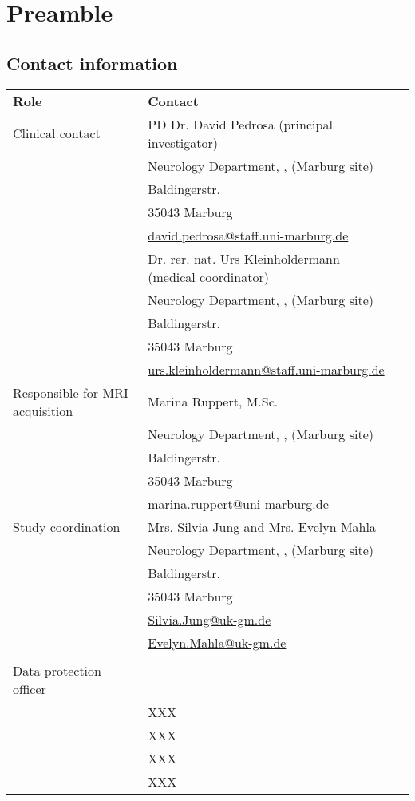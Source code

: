 \chapter{Preamble}
\section{Contact information}
\begin{tabularx}{0.85\textwidth}{@{}lp{9cm} *{1}{l} @{}}
\toprule
\textbf{Role} & \textbf{Contact} \\
\cmidrule{1-2}
Clinical contact 	& PD Dr. David Pedrosa (principal investigator) \\
			& Neurology Department, \UKM, (Marburg site)\\
			& Baldingerstr.\\
			& 35043 Marburg\\
			& \href{mailto:david.pedrosa@staff.uni-marburg.de}{david.pedrosa@staff.uni-marburg.de}\\
\cmidrule{2-3}
			& Dr. rer. nat. Urs Kleinholdermann (medical coordinator) \\
			& Neurology Department, \UKM, (Marburg site)\\
			& Baldingerstr.\\
			& 35043 Marburg\\
			& \href{mailto:urs.kleinholdermann@staff.uni-marburg.de}{urs.kleinholdermann@staff.uni-marburg.de}\\

\cmidrule{1-2}
Responsible for \ac{MRI}-acquisition & Marina Ruppert, M.Sc.\\
			& Neurology Department, \UKM, (Marburg site)\\
			& Baldingerstr.\\
			& 35043 Marburg\\
			& \href{mailto:marina.ruppert@uni-marburg.de}{marina.ruppert@uni-marburg.de}\\
\cmidrule{1-2}
Study coordination & Mrs. Silvia Jung and Mrs. Evelyn Mahla\\
			& Neurology Department, \UKM, (Marburg site)\\
			& Baldingerstr.\\
			& 35043 Marburg\\
			& \href{mailto:Silvia.Jung@uk-gm.de}{Silvia.Jung@uk-gm.de}\\
			& \href{mailto:Evelyn.Mahla@uk-gm.de}{Evelyn.Mahla@uk-gm.de}\\
	\\

\cmidrule{1-2}
Data protection officer & \\
			& XXX\\
			& XXX\\
			& XXX\\
			& XXX\\
\bottomrule
\end{tabularx}
\newpage

